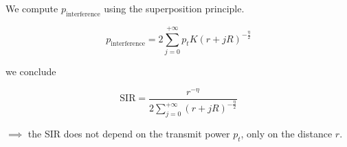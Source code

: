 \documentclass[]{article}
\begin{document}
	We compute $p_{\text{interference}}$ using the superposition principle.
	
	\begin{equation}
		p_{\text{interference}} = 2\sum_{j=0}^{+\infty} p_t K (r + jR)^{-\frac{\eta}{2}}
	\end{equation}
	
	we conclude
	
	\begin{equation}
		\mathrm{SIR} = \frac{r^{-\eta}}{2\sum_{j=0}^{+\infty} (r + jR)^{-\frac{\eta}{2}}}
	\end{equation}
	
	$\implies$ the SIR does not depend on the transmit power $p_t$, only on the distance $r$.
	
	
\end{document}
